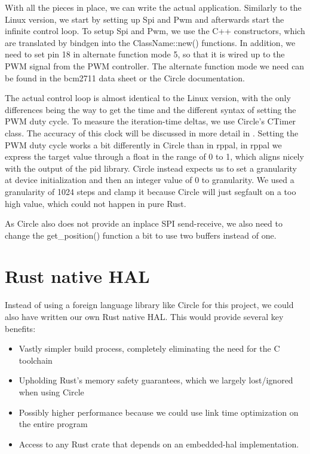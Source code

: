 With all the pieces in place, we can write the actual application.
Similarly to the Linux version, we start by setting up Spi and Pwm and afterwards start the infinite control loop.
To setup Spi and Pwm, we use the C++ constructors, which are translated by bindgen into the ClassName::new() functions.
In addition, we need to set pin 18 in alternate function mode 5, so that it is wired up to the PWM signal from the PWM controller.
The alternate function mode we need can be found in the bcm2711 data sheet or the Circle documentation.



The actual control loop is almost identical to the Linux version, with the only differences being the way to get the time and the different syntax of setting the PWM duty cycle.
To measure the iteration-time deltas, we use Circle's CTimer class. The accuracy of this clock will be discussed in more detail in .
Setting the PWM duty cycle works a bit differently in Circle than in rppal,
in rppal we express the target value through a float in the range of 0 to 1,
which aligns nicely with the output of the pid library.
Circle instead expects us to set a granularity at device initialization and then an integer value of 0 to granularity.
We used a granularity of 1024 steps and clamp it because Circle will just segfault on a too high value, which could not happen in pure Rust.



As Circle also does not provide an inplace SPI send-receive, we also need to change the get\_position() function a bit to use two buffers instead of one.


\section{Rust native HAL}
\label{sec:concept_and_implementation:hal}

Instead of using a foreign language library like Circle for this project, we could also have written our own Rust native HAL.
This would provide several key benefits:
\begin{itemize}
    \item Vastly simpler build process, completely eliminating the need for the C toolchain
    \item Upholding Rust's memory safety guarantees, which we largely lost/ignored when using Circle
    \item Possibly higher performance because we could use link time optimization on the entire program
    \item Access to any Rust crate that depends on an embedded-hal implementation.
\end{itemize}

